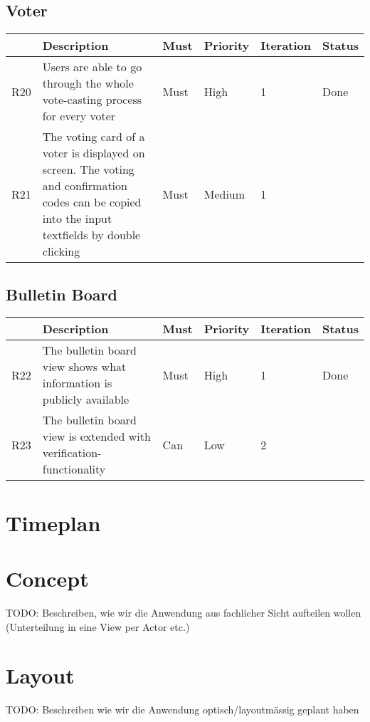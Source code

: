 \subsection{Voter}
\begin{longtable}{p{0.4cm}p{9cm}p{1cm}p{1cm}p{1cm}p{1cm}}
\hline
 & Description & Must & Priority & Iteration & Status\\
\hline
R20 & Users are able to go through the whole vote-casting process for every voter & Must & High & 1 & Done\\
R21 & The voting card of a voter is displayed on screen. The voting and confirmation codes can be copied into the input textfields by double clicking & Must & Medium & 1 & \\
\end{longtable}


\subsection{Bulletin Board}
\begin{longtable}{p{0.4cm}p{9cm}p{1cm}p{1cm}p{1cm}p{1cm}}
\hline
 & Description & Must & Priority & Iteration & Status\\
\hline
R22 & The bulletin board view shows what information is publicly available & Must & High & 1 & Done\\
R23 & The bulletin board view is extended with verification-functionality & Can & Low & 2 & \\
\end{longtable}


\section{Timeplan}

\section{Concept}
TODO: Beschreiben, wie wir die Anwendung aus fachlicher Sicht aufteilen wollen (Unterteilung in eine View per Actor etc.)

\section{Layout}
TODO: Beschreiben wie wir die Anwendung optisch/layoutmässig geplant haben
